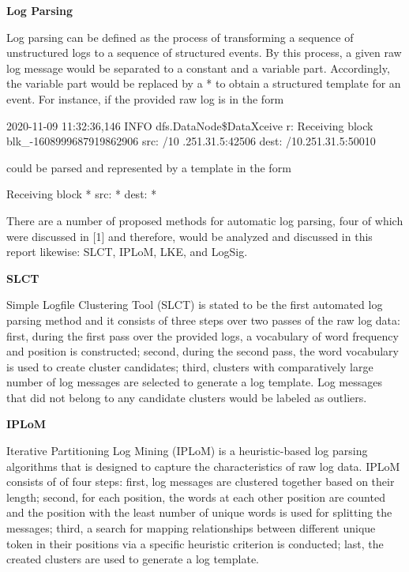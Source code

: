 \documentclass[12pt,a4paper]{article}
\begin{document}
	\vspace{0.4cm}
	\noindent \textbf{\large Log Parsing}
	\vspace{0.3cm}
	
	\noindent Log parsing can be defined as the process of transforming a sequence of unstructured logs to a sequence of structured events. By this process, a given raw log message would be separated to a constant and a variable part. Accordingly, the variable part would be replaced by a * to obtain a structured template for an event. For instance, if the provided raw log is in the form 
	\begin{center}
		2020-11-09 11:32:36,146 INFO dfs.DataNode\$DataXceive r: Receiving block blk\_-1608999687919862906 src: /10 .251.31.5:42506 dest: /10.251.31.5:50010
	\end{center}
	could be parsed and represented by a template in the form 
	\begin{center}
		Receiving block * src: * dest: *
	\end{center}
	There are a number of proposed methods for automatic log parsing, four of which were discussed in [1] and therefore, would be analyzed and discussed in this report likewise: SLCT, IPLoM, LKE, and LogSig.
	
	\vspace{0.3cm}
	\noindent \textbf{SLCT}
	\vspace{0.2cm}
	
	\noindent Simple Logfile Clustering Tool (SLCT) is stated to be the first automated log parsing method and it consists of three steps over two passes of the raw log data: first, during the first pass over the provided logs, a vocabulary of word frequency and position is constructed; second, during the second pass, the word vocabulary is used to create cluster candidates; third, clusters with comparatively large number of log messages are selected to generate a log template. Log messages that did not belong to any candidate clusters would be labeled as outliers.
	
	\newpage
	\noindent \textbf{IPLoM}
	\vspace{0.2cm}
	
	\noindent Iterative Partitioning Log Mining (IPLoM) is a heuristic-based log parsing algorithms that is designed to capture the characteristics of raw log data. IPLoM consists of of four steps: first, log messages are clustered together based on their length; second, for each position, the words at each other position are counted and the position with the least number of unique words is used for splitting the messages; third, a search for mapping relationships between different unique token in their positions via a specific heuristic criterion is conducted; last, the created clusters are used to generate a log template. 
	
\end{document}

